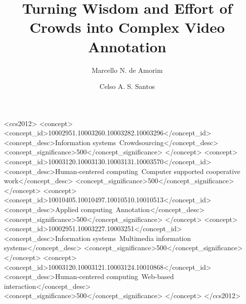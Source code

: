 \documentclass[sigconf]{acmart}
\begin{document}
\title{Turning Wisdom and Effort of Crowds into Complex Video Annotation}

\author{Marcello N. de Amorim}

\author{Celso A. S. Santos}


\renewcommand{\shortauthors}{Marcello N. de Amorim et. al.}


\begin{abstract}
	
\end{abstract}

\begin{CCSXML}
<ccs2012>
<concept>
<concept_id>10002951.10003260.10003282.10003296</concept_id>
<concept_desc>Information systems~Crowdsourcing</concept_desc>
<concept_significance>500</concept_significance>
</concept>
<concept>
<concept_id>10003120.10003130.10003131.10003570</concept_id>
<concept_desc>Human-centered computing~Computer supported cooperative work</concept_desc>
<concept_significance>500</concept_significance>
</concept>
<concept>
<concept_id>10010405.10010497.10010510.10010513</concept_id>
<concept_desc>Applied computing~Annotation</concept_desc>
<concept_significance>500</concept_significance>
</concept>
<concept>
<concept_id>10002951.10003227.10003251</concept_id>
<concept_desc>Information systems~Multimedia information systems</concept_desc>
<concept_significance>500</concept_significance>
</concept>
<concept>
<concept_id>10003120.10003121.10003124.10010868</concept_id>
<concept_desc>Human-centered computing~Web-based interaction</concept_desc>
<concept_significance>500</concept_significance>
</concept>
</ccs2012>
\end{CCSXML}





\maketitle
\end{document}
